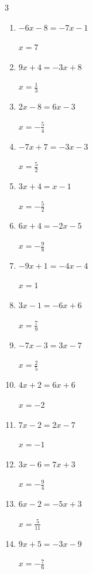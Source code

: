 \begin{multicols}{3}
\begin{enumerate}
        $\displaystyle x=\frac{8}{7}$

  \item $-6x-8=-7x-1$

        $\displaystyle x=7$

  \item $9x+4=-3x+8$

        $\displaystyle x=\frac{1}{3}$

  \item $2x-8=6x-3$

        $\displaystyle x=-\frac{5}{4}$

  \item $-7x+7=-3x-3$

        $\displaystyle x=\frac{5}{2}$

  \item $3x+4=x-1$

        $\displaystyle x=-\frac{5}{2}$

  \item $6x+4=-2x-5$

        $\displaystyle x=-\frac{9}{8}$

  \item $-9x+1=-4x-4$

        $\displaystyle x=1$

\columnbreak %

  \item $3x-1=-6x+6$

        $\displaystyle x=\frac{7}{9}$

  \item $-7x-3=3x-7$

        $\displaystyle x=\frac{2}{5}$

  \item $4x+2=6x+6$

        $\displaystyle x=-2$

  \item $7x-2=2x-7$

        $\displaystyle x=-1$

  \item $3x-6=7x+3$

        $\displaystyle x=-\frac{9}{4}$

  \item $6x-2=-5x+3$

        $\displaystyle x=\frac{5}{11}$

  \item $9x+5=-3x-9$

        $\displaystyle x=-\frac{7}{6}$


\end{enumerate}
\end{multicols}
